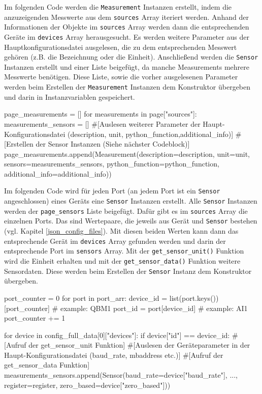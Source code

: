Im folgenden Code werden die \lstinline{Measurement} Instanzen erstellt, indem die anzuzeigenden Messwerte aus dem \lstinline{sources} Array iteriert werden. Anhand der Informationen der Objekte im \lstinline{sources} Array werden dann die entsprechenden Geräte im \lstinline{devices} Array herausgesucht. Es werden weitere Parameter aus der Hauptkonfigurationsdatei ausgelesen, die zu dem entsprechenden Messwert gehören (z.B. die Bezeichnung oder die Einheit). Anschließend werden die \lstinline{Sensor} Instanzen erstellt und einer Liste beigefügt, da manche Measurements mehrere Messwerte benötigen. Diese Liste, sowie die vorher ausgelesenen Parameter werden beim Erstellen der \lstinline{Measurement} Instanzen dem Konstruktor übergeben und darin in Instanzvariablen gespeichert.
\begin{pythoncode}
page_measurements = []
for measurements in page["sources"]:
	measurements_sensors = []
	#[Auslesen weiterer Parameter der Haupt-Konfigurationsdatei (description, unit, python_function,additional_info)]
	#[Erstellen der Sensor Instanzen (Siehe nächster Codeblock)]
	page_measurements.append(Measurement(description=description, unit=unit, sensors=measurements_sensors, python_function=python_function, additional_info=additional_info))
\end{pythoncode}

Im folgenden Code wird für jeden Port (an jedem Port ist ein \lstinline{Sensor} angeschlossen) eines Geräts eine \lstinline{Sensor} Instanzen erstellt. Alle \lstinline{Sensor} Instanzen werden der \lstinline{page_sensors} Liste beigefügt. Dafür gibt es im \lstinline{sources} Array die einzelnen Ports. Das sind Wertepaare, die jeweils aus Gerät und \lstinline{Sensor} bestehen (vgl. Kapitel \ref{json_config_files}). Mit diesen beiden Werten kann dann das entsprechende Gerät im \lstinline{devices} Array gefunden werden und darin der entsprechende Port im \lstinline{sensors} Array. Mit der \lstinline{get_sensor_unit()} Funktion wird die Einheit erhalten und mit der \lstinline{get_sensor_data()} Funktion weitere Sensordaten. Diese werden beim Erstellen der \lstinline{Sensor} Instanz dem Konstruktor übergeben.
\begin{pythoncode}
port_counter = 0
for port in port_arr:
	device_id = list(port.keys())[port_counter] # example: QBM1
	port_id = port[device_id]  # example: AI1
	port_counter += 1
	
	for device in config_full_data[0]["devices"]:
		if device["id"] == device_id:
			#[Aufruf der get_sensor_unit Funktion]
			#[Auslesen der Geräteparameter in der Haupt-Konfigurationsdatei (baud_rate, mbaddress etc.)]
			#[Aufruf der get_sensor_data Funktion]
			measurements_sensors.append(Sensor(baud_rate=device["baud_rate"], ..., register=register, zero_based=device["zero_based"]))
\end{pythoncode}

